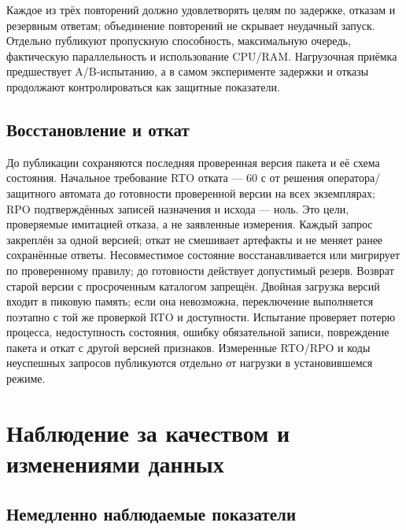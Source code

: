 \documentclass[12pt,a4paper]{article}
\theoremstyle{plainru}
\begin{document}
Каждое из трёх повторений должно удовлетворять целям по задержке,
отказам и резервным ответам; объединение повторений не скрывает
неудачный запуск. Отдельно публикуют пропускную способность,
максимальную очередь, фактическую параллельность и использование CPU/RAM.
Нагрузочная приёмка предшествует A/B-испытанию, а в самом эксперименте
задержки и отказы продолжают контролироваться как защитные показатели.

\subsection{Восстановление и откат}\label{sec:ops-recovery}

До публикации сохраняются последняя проверенная версия пакета
и её схема состояния. Начальное требование RTO отката --- 60 с
от решения оператора/защитного автомата до готовности проверенной
версии на всех экземплярах; RPO подтверждённых записей назначения
и исхода --- ноль. Это цели, проверяемые имитацией отказа,
а не заявленные измерения. Каждый запрос закреплён за одной версией;
откат не смешивает артефакты и не меняет ранее сохранённые ответы.
Несовместимое состояние восстанавливается или мигрирует по
проверенному правилу; до готовности действует допустимый резерв.
Возврат старой версии с просроченным каталогом запрещён.
Двойная загрузка версий входит в пиковую память; если она невозможна,
переключение выполняется поэтапно с той же проверкой RTO и доступности.
Испытание проверяет потерю процесса, недоступность состояния,
ошибку обязательной записи, повреждение пакета и откат с другой
версией признаков. Измеренные RTO/RPO и коды неуспешных запросов
публикуются отдельно от нагрузки в установившемся режиме.

\section{Наблюдение за качеством и изменениями данных}\label{sec:operations-monitoring}

\subsection{Немедленно наблюдаемые показатели}
\end{document}
